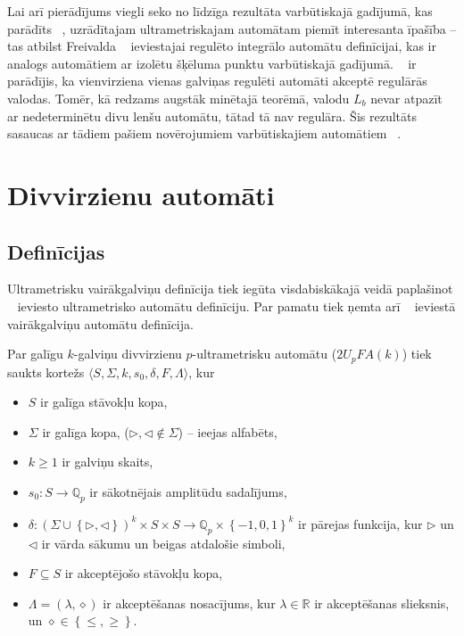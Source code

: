 \documentclass{ludis}
\begin{document}

Lai arī pierādījums viegli seko no līdzīga rezultāta varbūtiskajā gadījumā, kas parādīts ~\citep{Freivalds1979}, uzrādītajam ultrametriskajam automātam piemīt interesanta īpašība -- tas atbilst Freivalda ~\citep{Freivalds2012} ieviestajai regulēto integrālo automātu definīcijai, kas ir analogs automātiem ar izolētu šķēluma punktu varbūtiskajā gadījumā. ~\citet{KasparsBalodis2013} ir parādījis, ka vienvirziena vienas galviņas regulēti automāti akceptē regulārās valodas. Tomēr, kā redzams augstāk minētajā teorēmā, valodu $L_b$ nevar atpazīt ar nedeterminētu divu lenšu automātu, tātad tā nav regulāra. Šis rezultāts sasaucas ar tādiem pašiem novērojumiem varbūtiskajiem automātiem ~\citep{Freivalds1981,Freivalds1979}.

\chapter{Divvirzienu automāti}
\section{Definīcijas}
Ultrametrisku vairākgalviņu definīcija tiek iegūta visdabiskākajā veidā paplašinot ~\citep{KasparsBalodis2013} ieviesto ultrametrisko automātu definīciju. Par pamatu tiek ņemta arī ~\citep{Holzer2009} ieviestā vairākgalviņu automātu definīcija.

\begin{definicija}
Par galīgu $k$-galviņu divvirzienu $p$-ultrametrisku automātu ($2U_pFA(k)$) tiek saukts kortežs $\langle S, \Sigma, k, s_0, \delta, F, \Lambda \rangle$, kur
\begin{itemize}
	\item $S$ ir galīga stāvokļu kopa,
	\item $\Sigma$ ir galīga kopa, ($ \triangleright,\triangleleft \notin \Sigma$) -- ieejas alfabēts,
	\item $k\geq 1$ ir galviņu skaits, 
	\item $s_0:S \rightarrow \mathbb{Q}_p$ ir sākotnējais amplitūdu sadalījums,
	\item $\delta: \left( \Sigma \cup \left\{ \triangleright, \triangleleft \right\} \right)^k \times S \times S \rightarrow \mathbb{Q}_p \times \left\{-1,0,1\right\}^k$ ir pārejas funkcija, kur $\triangleright$ un $\triangleleft$ ir vārda sākumu un beigas atdalošie simboli,
	\item $F \subseteq S$ ir akceptējošo stāvokļu kopa,
	\item $\Lambda = \left( \lambda, \diamond \right)$ ir akceptēšanas nosacījums, kur $\lambda \in \mathbb{R}$ ir akceptēšanas slieksnis, un $\diamond \in \left\{ \leq, \geq \right\}$.
\end{itemize}
\end{definicija}
\end{document}
